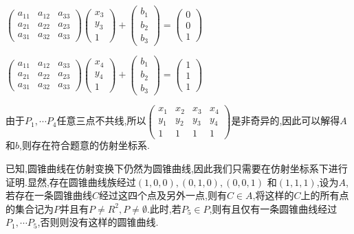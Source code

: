 \documentclass[UTF8]{book}
\begin{document}
			
			$\left(\begin{array}{lll}{a_{11}} & {a_{12}} & {a_{33}} \\ {a_{21}} & {a_{22}} & {a_{23}} \\ {a_{31}} & {a_{32}} & {a_{33}}\end{array}\right)\left(\begin{array}{l}{x_{3}} \\ {y_{3}} \\ 1\end{array}\right)+\left(\begin{array}{l}{b_{1}} \\ {b_{2}} \\ {b_{3}}\end{array}\right)=\left(\begin{array}{c}{0} \\ {0} \\ {1}\end{array}\right)$
		
		
			$\left(\begin{array}{lll}{a_{11}} & {a_{12}} & {a_{33}} \\ {a_{21}} & {a_{22}} & {a_{23}} \\ {a_{31}} & {a_{32}} & {a_{33}}\end{array}\right)\left(\begin{array}{l}{x_{4}} \\ {y_{4}} \\ 1\end{array}\right)+\left(\begin{array}{l}{b_{1}} \\ {b_{2}} \\ {b_{3}}\end{array}\right)=\left(\begin{array}{c}{1} \\ {1} \\ {1}\end{array}\right)$
			
			
			由于$ P_{1},\cdots P_{4} $任意三点不共线,所以$ \left(\begin{array}{llll}{x_{1}} & {x_{2}} & {x_{3}}& {x_{4}} \\ {y_{1}} & {y_{2}} & {y_{3}}& {y_{4}} \\ 1 & 1 & 1& 1\end{array}\right) $是非奇异的,因此可以解得$ A $和$ b $,则存在符合题意的仿射坐标系.
			
			
			已知,圆锥曲线在仿射变换下仍然为圆锥曲线,因此我们只需要在仿射坐标系下进行证明.显然,存在圆锥曲线族经过$ (1,0,0),(0,1,0),(0,0,1) $ 和$ (1,1,1) $,设为$ A $,若存在一条圆锥曲线$ C $经过这四个点及另外一点,则有$ C \in A $,将这样的$ C $上的所有点的集合记为$ P $并且有$ P \not = R^{2},P \not = \emptyset $.此时,若$ P_{5} \in P$,则有且仅有一条圆锥曲线经过$ P_{1},\cdots P_{5} $,否则则没有这样的圆锥曲线.
\end{document}
